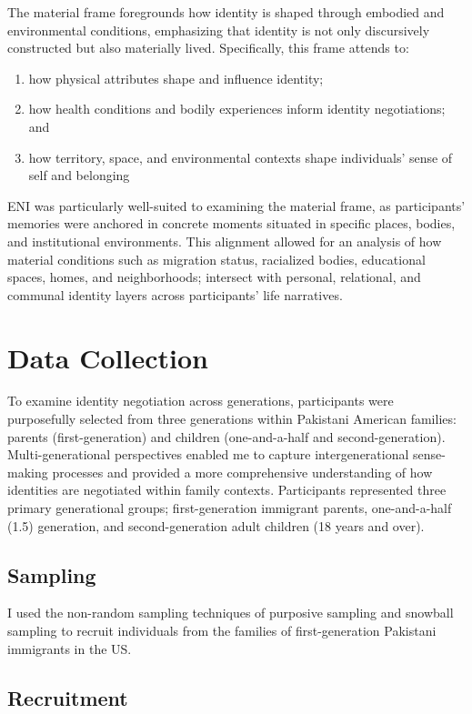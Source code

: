 The material frame foregrounds how identity is shaped through embodied and environmental conditions, emphasizing that identity is not only discursively constructed but also materially lived. Specifically, this frame attends to:
\begin{enumerate}[label=(\arabic*)]
\item how physical attributes shape and influence identity;
\item how health conditions and bodily experiences inform identity negotiations; and
\item how territory, space, and environmental contexts shape individuals’ sense of self and belonging
\end{enumerate}


ENI was particularly well-suited to examining the material frame, as participants’ memories were anchored in concrete moments situated in specific places, bodies, and institutional environments. This alignment allowed for an analysis of how material conditions such as migration status, racialized bodies, educational spaces, homes, and neighborhoods; intersect with personal, relational, and communal identity layers across participants’ life narratives.

\section{Data Collection}

To examine identity negotiation across generations, participants were purposefully selected from three generations within Pakistani American families: parents (first-generation) and children (one-and-a-half and second-generation). Multi-generational perspectives enabled me to capture intergenerational sense-making processes and provided a more comprehensive understanding of how identities are negotiated within family contexts. Participants represented three primary generational groups; first-generation immigrant parents, one-and-a-half (1.5) generation, and second-generation adult children (18 years and over).

\subsection{Sampling}

I used the non-random sampling techniques of purposive sampling and snowball sampling to recruit individuals from the families of first-generation Pakistani immigrants in the US.

\subsection{Recruitment}

